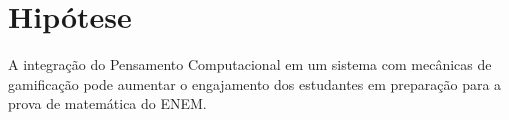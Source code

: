 
\chapter{Hipótese}
\label{ch:hipotese}

A integração do Pensamento Computacional em um sistema com mecânicas de gamificação pode aumentar o engajamento dos estudantes em preparação para a prova de matemática do ENEM.